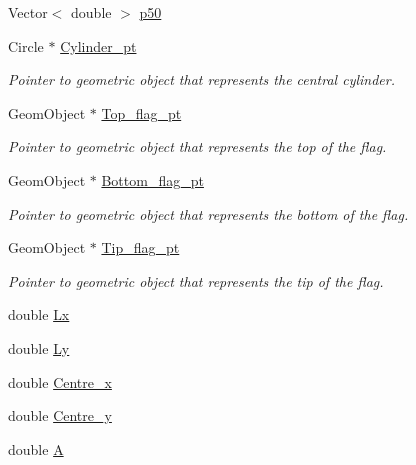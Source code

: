 \begin{DoxyCompactItemize}
\item 
Vector$<$ double $>$ \hyperlink{classoomph_1_1CylinderWithFlagDomain_a0b46b0c29925ba405a04fda8b3ab9c06}{p50}
\item 
Circle $\ast$ \hyperlink{classoomph_1_1CylinderWithFlagDomain_afb13bdcd16005bc0505908bb3c844f33}{Cylinder\+\_\+pt}
\begin{DoxyCompactList}\small\item\em Pointer to geometric object that represents the central cylinder. \end{DoxyCompactList}\item 
Geom\+Object $\ast$ \hyperlink{classoomph_1_1CylinderWithFlagDomain_a92ae4556f99335233c1c653e15fa1f48}{Top\+\_\+flag\+\_\+pt}
\begin{DoxyCompactList}\small\item\em Pointer to geometric object that represents the top of the flag. \end{DoxyCompactList}\item 
Geom\+Object $\ast$ \hyperlink{classoomph_1_1CylinderWithFlagDomain_ae4bfb961e03aab16d01fc4662c0214e3}{Bottom\+\_\+flag\+\_\+pt}
\begin{DoxyCompactList}\small\item\em Pointer to geometric object that represents the bottom of the flag. \end{DoxyCompactList}\item 
Geom\+Object $\ast$ \hyperlink{classoomph_1_1CylinderWithFlagDomain_a2926eb3a4c171fbc924115f7dfd211a4}{Tip\+\_\+flag\+\_\+pt}
\begin{DoxyCompactList}\small\item\em Pointer to geometric object that represents the tip of the flag. \end{DoxyCompactList}\item 
double \hyperlink{classoomph_1_1CylinderWithFlagDomain_aba284322fcd3d9b9a4231ec71ea6d96b}{Lx}
\item 
double \hyperlink{classoomph_1_1CylinderWithFlagDomain_a733fc387ee7d25811edb6b99c796b242}{Ly}
\item 
double \hyperlink{classoomph_1_1CylinderWithFlagDomain_a9473fc0eb249a20c8a3456c708c8ba6f}{Centre\+\_\+x}
\item 
double \hyperlink{classoomph_1_1CylinderWithFlagDomain_aee096a172eec5ffc3719b625c52beb26}{Centre\+\_\+y}
\item 
double \hyperlink{classoomph_1_1CylinderWithFlagDomain_afdb4b1beb7e574e1bcfc7fbb8a6df700}{A}
\end{DoxyCompactItemize}


